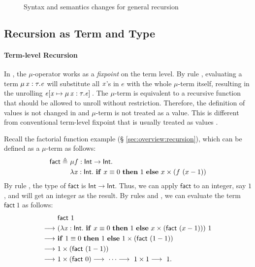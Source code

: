 \begin{figure}
	\gram{\newsyntax}\ottinterrule
	\ottdefnstepXXrec{}\ottinterrule
	\ottdefnexprXXrec{}
	\caption{Syntax and semantics changes for general recursion}
    \label{fig:rec:ext}
\end{figure}

\subsection{Recursion as Term and Type}
\paragraph{Term-level Recursion}

In \name, the $ \mu $-operator works as a \emph{fixpoint} on the term
level. By rule , evaluating a term $\mu \, \mathit{x}  :  \tau  .  \mathit{e}$ will
substitute all $\mathit{x}$'s in $e$ with the whole $ \mu $-term itself,
resulting in the unrolling $\mathit{e}  [  \mathit{x}  \mapsto  \mu \, \mathit{x}  :  \tau  .  \mathit{e}  ] \,$. The
$ \mu $-term is equivalent to a recursive function that should be
allowed to unroll without restriction. Therefore, the definition of
values is not changed in \name and $ \mu $-term is not treated as a
value. This is different from conventional term-level fixpoint that is
usually treated as values \cite{zombie:popl14}.

Recall the factorial function example (\S
\ref{sec:overview:recursion}), which can be defined as a $ \mu $-term
as follows:
\begin{align*}
    \mathsf{fact}  \triangleq ~  & \mu  f : \mathsf{Int}  \rightarrow  \mathsf{Int} . \\ &\lambda  \mathit{x}  :  \mathsf{Int}  .  ~\mathbf{if}~x  \equiv 0~\mathbf{then}~1~\mathbf{else}~x \times (f~(x
    - 1))
\end{align*}
By rule , the type of $\mathsf{fact}$ is $\mathsf{Int}  \rightarrow  \mathsf{Int}$. Thus, we can apply $\mathsf{fact}$ to an integer, say $1$, and
will get an integer as the result.  By rules  and
, we can evaluate the term $\mathsf{fact}~1$ as follows:
\begin{align*}
    &\mathsf{fact}~1 \\  \longrightarrow ~& (\lambda  \mathit{x}  :  \mathsf{Int}  .  ~\mathbf{if}~x
   \equiv 0~\mathbf{then}~1~\mathbf{else}~x \times (\mathsf{fact}~(x - 1)))~1
  \\  \longrightarrow ~ & \mathbf{if}~1  \equiv 0~\mathbf{then}~1~\mathbf{else}~1 \times
  (\mathsf{fact}~(1 - 1)) \\  \longrightarrow ~& 1 \times (\mathsf{fact}~(1-1))
  \\  \longrightarrow ~& 1 \times (\mathsf{fact}~0)  \longrightarrow ~ \dots  \longrightarrow ~ 1 \times
  1  \longrightarrow ~ 1.
\end{align*}

